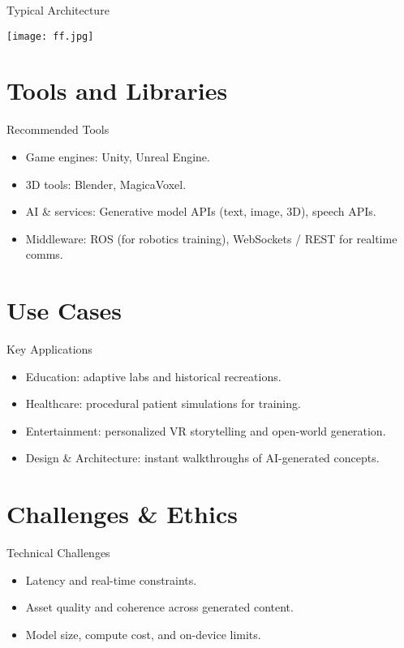 \documentclass[11pt]{beamer}
\begin{document}
\begin{frame}{Typical Architecture}
  \begin{center}
    \texttt{[image: ff.jpg]}
  \end{center}
\end{frame}

\section{Tools and Libraries}
\begin{frame}{Recommended Tools}
  \begin{itemize}
    \item Game engines: Unity, Unreal Engine.
    \item 3D tools: Blender, MagicaVoxel.
    \item AI & services: Generative model APIs (text, image, 3D), speech APIs.
    \item Middleware: ROS (for robotics training), WebSockets / REST for realtime comms.
  \end{itemize}
\end{frame}

\section{Use Cases}
\begin{frame}{Key Applications}
  \begin{itemize}
    \item Education: adaptive labs and historical recreations.
    \item Healthcare: procedural patient simulations for training.
    \item Entertainment: personalized VR storytelling and open-world generation.
    \item Design & Architecture: instant walkthroughs of AI-generated concepts.
  \end{itemize}
\end{frame}

\section{Challenges \& Ethics}
\begin{frame}{Technical Challenges}
  \begin{itemize}
    \item Latency and real-time constraints.
    \item Asset quality and coherence across generated content.
    \item Model size, compute cost, and on-device limits.
  \end{itemize}
\end{frame}
\end{document}
